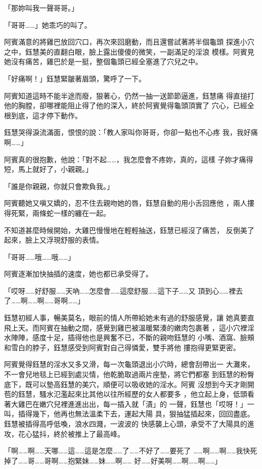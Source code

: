 「那妳叫我一聲哥哥。」

「哥哥……」她乖巧的叫了。

阿賓滿意的將雞巴放回穴口，再次來回磨動，而且還嘗試著將半個龜頭
探進小穴之中，鈺慧美的直翻白眼，臉上露出傻傻的微笑，一副滿足的淫浪
模樣。阿賓見她沒有痛苦，雞巴於是一挺，整個龜頭已經全塞進了穴兒之中。

「好痛啊！」鈺慧緊皺著眉頭，驚呼了一下。

阿賓知道這時不能半途而廢，狠著心，仍然一抽一送節節逼進，鈺慧痛
得直搥打他的胸膛，卻哪裡能阻止得了他的深入，終於阿賓覺得龜頭頂實了
穴心，已經全根到底，這才停下動作。

鈺慧哭得淚流滿面，恨恨的說：「教人家叫你哥哥，你卻一點也不心疼
我，我好痛啊……」

阿賓真的很抱歉，他說：「對不起……，我怎麼會不疼妳，真的，這樣
子妳才痛得短，馬上就好了，小親親。」

「誰是你親親，你就只會欺負我。」

阿賓聽她又嗔又嬌的，忍不住去親吻她的唇，鈺慧自動的用小舌回應他
，兩人摟得死緊，兩條蛇一樣的纏在一起。

不知道甚麼時候開始，大雞巴慢慢地在輕輕抽送，鈺慧已經沒了痛苦，
反倒美了起來，臉上又浮現舒服的表情。

「哥哥……哦……哦……」

阿賓逐漸加快抽插的速度，她也都已承受得了。

「哎呀……好舒服……天吶……怎麼會……這麼舒服……這下子……又
頂到心……裡去了……啊……啊……哥啊……」

鈺慧初經人事，暢美莫名，眼前的情人所帶給她未有過的舒服感覺，讓
她真要直飛上天。而阿賓在抽動之間，感覺到雞巴被溫暖緊湊的嫩肉包裹著
，這小穴裡淫水陣陣，感度十足，插得他也是興奮不已，不斷的親吻鈺慧的
小嘴、酒窩、臉頰和雪白的脖子，鈺慧感受到阿賓對自己得憐愛，雙手將他
摟抱得更緊更密。

阿賓覺得鈺慧的淫水又多又滑，每一次龜頭退出小穴時，總會刮帶出一
大灘來，不一會兒地毯上已經到處災情，他乾脆取過兩片座墊，將它們都塞
到鈺慧的粉臀底下，既可以墊高鈺慧的美穴，順便可以吸收她的淫水。阿賓
沒想到今天才剛開苞的鈺慧，騷水氾濫起來比其他以往所經歷的女人都要多
，他立起上身，低頭看著大雞巴在嫩穴兒裡進進出出，每一插入就「漬」的
一聲，鈺慧也「哎呀！」一叫，插得幾下，他再也無法溫柔下去，運起大陽
具，狠抽猛插起來，回回盡底。鈺慧被插得高呼低喚，浪水四濺，一波波的
快感襲上心頭，承受不了大陽具的進攻，花心猛抖，終於被推上了最高峰。

「啊……啊……天哪……這……這是怎麼……了……不好了……要死了
……啊……啊……我快死掉了……哥……哥啊……抱緊妹……妹……啊……
好……好美啊……啊……啊……」

